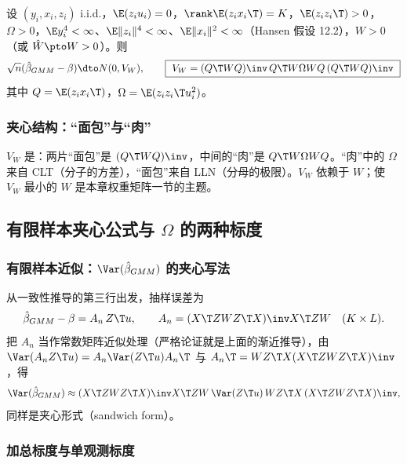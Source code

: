 \begin{thm}\label{thm:U08a-asy}
设 $(y_i,x_i,z_i)$ i.i.d.，$\E(z_iu_i)=0$，$\rank\E(z_ix_i\T)=K$，$\E(z_iz_i\T)>0$，$\Omega>0$，$\E y_i^4<\infty$、$\E\|z_i\|^4<\infty$、$\E\|x_i\|^2<\infty$（Hansen 假设 12.2），$W>0$（或 $\hat W\pto W>0$）。则
\begin{equation}\label{eq:U08a-asy}
\sqrt n(\hat\beta_{GMM}-\beta)\dto N(0,V_W),\qquad
\boxed{\ V_W=(Q\T WQ)\inv\,Q\T W\Omega WQ\,(Q\T WQ)\inv\ }
\end{equation}
其中 $Q=\E(z_ix_i\T)$，$\Omega=\E(z_iz_i\T u_i^2)$。
\end{thm}

\subsubsection{夹心结构：“面包”与“肉”}

$V_W$ 是：两片“面包”是 $(Q\T WQ)\inv$，中间的“肉”是 $Q\T W\Omega WQ$。“肉”中的 $\Omega$ 来自 CLT（分子的方差），“面包”来自 LLN（分母的极限）。$V_W$ 依赖于 $W$；使 $V_W$ 最小的 $W$ 是本章权重矩阵一节的主题。

\subsection{有限样本夹心公式与 \texorpdfstring{$\Omega$}{Omega} 的两种标度}\label{sec:U08a-scale}

\subsubsection{有限样本近似：\texorpdfstring{$\Var(\hat\beta_{GMM})$}{Var(beta-hat)} 的夹心写法}

从一致性推导的第三行出发，抽样误差为
\[
\hat\beta_{GMM}-\beta=A_n\,Z\T u,\qquad A_n=(X\T ZWZ\T X)\inv X\T ZW\quad(K\times L).
\]
把 $A_n$ 当作常数矩阵近似处理（严格论证就是上面的渐近推导），由 $\Var(A_nZ\T u)=A_n\Var(Z\T u)A_n\T$ 与 $A_n\T=WZ\T X(X\T ZWZ\T X)\inv$，得
\[
\Var(\hat\beta_{GMM})\approx(X\T ZWZ\T X)\inv X\T ZW\,\Var(Z\T u)\,WZ\T X\,(X\T ZWZ\T X)\inv,
\]
同样是夹心形式（sandwich form）。

\subsubsection{加总标度与单观测标度}

